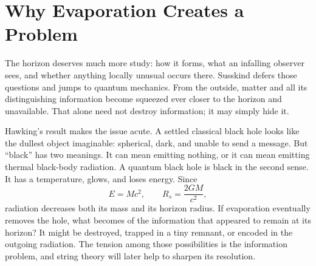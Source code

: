 \begin{classroomqa}
\end{classroomqa}

\begin{classroomqa}
\end{classroomqa}

\section{Why Evaporation Creates a Problem}

The horizon deserves much more study: how it forms, what an infalling observer sees, and whether anything locally unusual occurs there.  Susskind defers those questions and jumps to quantum mechanics.  From the outside, matter and all its distinguishing information become squeezed ever closer to the horizon and unavailable.  That alone need not destroy information; it may simply hide it.

Hawking's result makes the issue acute.  A settled classical black hole looks like the dullest object imaginable: spherical, dark, and unable to send a message.  But ``black'' has two meanings.  It can mean emitting nothing, or it can mean emitting thermal black-body radiation.  A quantum black hole is black in the second sense.  It has a temperature, glows, and loses energy.  Since
\begin{equation}
E=Mc^2,
\qquad
R_s=\frac{2GM}{c^2},
\end{equation}
radiation decreases both its mass and its horizon radius.  If evaporation eventually removes the hole, what becomes of the information that appeared to remain at its horizon?  It might be destroyed, trapped in a tiny remnant, or encoded in the outgoing radiation.  The tension among those possibilities is the information problem, and string theory will later help to sharpen its resolution.

